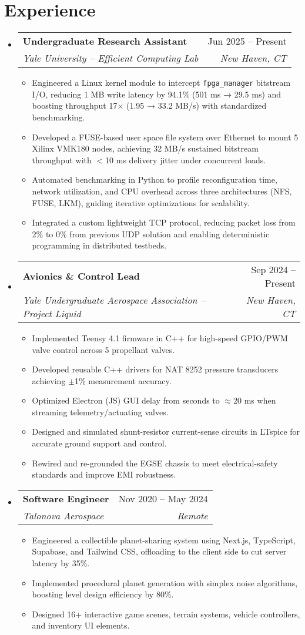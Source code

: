 \documentclass[letterpaper,11pt]{article}
\makeatletter
\newcommand{\resumeItem}[1]{
  \item\small{
    {#1 \vspace{-2pt}}
  }
}
\newcommand{\resumeSubheading}[4]{
  \vspace{-2pt}\item
    \begin{tabular*}{0.97\textwidth}[t]{l@{\extracolsep{\fill}}r}
      \textbf{#1} & #2 \\
      \textit{\small#3} & \textit{\small #4} \\
    \end{tabular*}\vspace{-7pt}
}
\newcommand{\resumeSubHeadingListStart}{\begin{itemize}[leftmargin=0.15in, label={}]}
\newcommand{\resumeSubHeadingListEnd}{\end{itemize}}
\newcommand{\resumeItemListStart}{\begin{itemize}}
\newcommand{\resumeItemListEnd}{\end{itemize}\vspace{-5pt}}
\makeatother
\begin{document}
\section{Experience}
  \resumeSubHeadingListStart
    \resumeSubheading
      {Undergraduate Research Assistant}{Jun 2025 -- Present}
      {Yale University -- Efficient Computing Lab}{New Haven, CT}
      \resumeItemListStart
        \resumeItem{Engineered a Linux kernel module to intercept {\tt fpga\_manager} bitstream I/O, reducing 1 MB write latency by 94.1\% (501 ms → 29.5 ms) and boosting throughput 17× (1.95 → 33.2 MB/s) with standardized benchmarking.}
        \resumeItem{Developed a FUSE-based user space file system over Ethernet to mount 5 Xilinx VMK180 nodes, achieving 32 MB/s sustained bitstream throughput with $<$10 ms delivery jitter under concurrent loads.}
        \resumeItem{Automated benchmarking in Python to profile reconfiguration time, network utilization, and CPU overhead across three architectures (NFS, FUSE, LKM), guiding iterative optimizations for scalability.}
        \resumeItem{Integrated a custom lightweight TCP protocol, reducing packet loss from 2\% to 0\% from previous UDP solution and enabling deterministic programming in distributed testbeds.}
      \resumeItemListEnd
    \resumeSubheading
      {Avionics \& Control Lead}{Sep 2024 -- Present}
      {Yale Undergraduate Aerospace Association -- Project Liquid}{New Haven, CT}
      \resumeItemListStart
        \resumeItem{Implemented Teensy 4.1 firmware in C++ for high-speed GPIO/PWM valve control across 5 propellant valves.}
        \resumeItem{Developed reusable C++ drivers for NAT 8252 pressure transducers achieving $\pm$1\% measurement accuracy.  }
        \resumeItem{Optimized Electron (JS) GUI delay from seconds to $\approx$20 ms when streaming telemetry/actuating valves.}
        \resumeItem{Designed and simulated shunt-resistor current-sense circuits in LTspice for accurate ground support and control.}
        \resumeItem{Rewired and re-grounded the EGSE chassis to meet electrical-safety standards and improve EMI robustness.}
      \resumeItemListEnd
    \resumeSubheading
      {Software Engineer}{Nov 2020 -- May 2024}
      {Talonova Aerospace}{Remote}
      \resumeItemListStart
        \resumeItem{Engineered a collectible planet-sharing system using Next.js, TypeScript, Supabase, and Tailwind CSS, offloading to the client side to cut server latency by 35\%.}
        \resumeItem{Implemented procedural planet generation with simplex noise algorithms, boosting level design efficiency by 80\%.}
        \resumeItem{Designed 16+ interactive game scenes, terrain systems, vehicle controllers, and inventory UI elements.}
      \resumeItemListEnd
  \resumeSubHeadingListEnd
\end{document}

